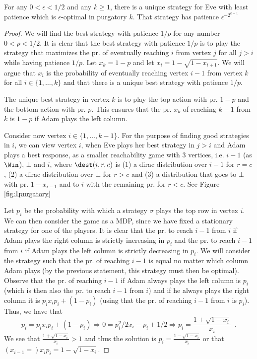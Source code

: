 \begin{lemma}\label{lem:purgatory}
For any $0<\epsilon<1/2$ and any $k\geq 1$, there is a unique strategy for Eve with least patience which is $\epsilon$-optimal in purgatory $k$. That strategy has patience $\epsilon^{-2^{k-1}}$
\end{lemma}
\begin{proof}
We will find the best strategy with patience $1/p$ for any number $0<p<1/2$.
It is clear that the best strategy with patience $1/p$ is to play the strategy that maximizes the pr. of eventually reaching $i$ from vertex $j$ for all $j>i$ while having patience $1/p$.
Let $x_k=1-p$ and let $x_i=1-\sqrt{1-x_{i+1}}$. We will argue that $x_i$ is the probability of eventually reaching vertex $i-1$ from vertex $k$ for all $i\in \{1,\dots,k\}$ and that there is a unique best strategy with patience $1/p$.

The unique best strategy in vertex $k$ is to play the top action with pr. $1-p$ and the bottom action with pr. $p$. This ensures that the pr. $x_k$ of reaching $k-1$ from $k$ is $1-p$ if Adam plays the left column.

Consider now vertex $i\in \{1,\dots,k-1\}$.
For the purpose of finding good strategies in $i$, we can view vertex $i$, when Eve plays her best strategy in $j>i$ and Adam plays a best response, as a smaller reachability game with 3 vertices, i.e. $i-1$ (as $\Win$), $\bot$ and $i$, where $\dest(i,r,c)$ is (1) a dirac distribution over $i-1$ for $r=c$, (2) a dirac distribution over $\bot$ for $r>c$ and (3) a distribution that goes to $\bot$ with pr. $1-x_{i-1}$ and to $i$ with the remaining pr. for $r<c$. See Figure \ref{fig:1purgatory}


Let $p_i$ be the probability with which a strategy $\sigma$ plays the top row in vertex $i$.
We can then consider the game as a MDP, since we have fixed a stationary strategy for one of the players.
It is clear that the pr. to reach $i-1$ from $i$ if Adam plays the right column is strictly increasing in $p_i$ and the pr. to reach $i-1$ from $i$ if Adam plays the left column is strictly decreasing in $p_i$. We will consider the strategy such that the pr. of reaching $i-1$ is equal no matter which column Adam plays (by the previous statement, this strategy must then be optimal).
Observe that the pr. of reaching $i-1$ if Adam always plays the left column is $p_i$ (which is then also the pr. to reach $i-1$ from $i$) and if he always plays the right column it is  $p_i x_i p_i+(1-p_i)$ (using that the pr. of reaching $i-1$ from $i$ is $p_i$).
Thus, we have that 
\[
p_i=p_i x_i p_i+(1-p_i)\Rightarrow 0=p_i^2/2 x_i-p_i+1/2 \Rightarrow p_i=\frac{1\pm \sqrt{1-x_i}}{x_i}\enspace .\] We see that $\frac{1+ \sqrt{1-x_i}}{x_i}>1$ and thus the solution is $p_i=\frac{1- \sqrt{1-x_i}}{x_i}$ or that $(x_{i-1}=)x_ip_i=1- \sqrt{1-x_i}$.


\end{proof}
